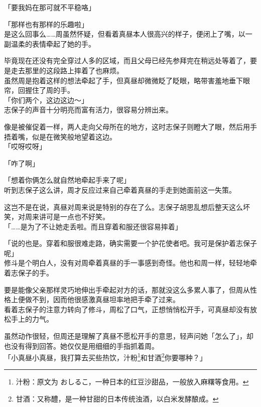 「要我妈在那可就不平稳咯」

「那样也有那样的乐趣啦」\\

是这么回事么……周虽然怀疑，但看着真昼本人很高兴的样子，便闭上了嘴，以一副温柔的表情牵起了她的手。

毕竟现在还没有完全穿过人多的区域，而且父母已经先参拜完在稍远处等着了，要是走去那里的这段路上摔着了也麻烦。\\

虽然周是抱着这样的想法牵起了手，但真昼却微微眨了眨眼，略带害羞地垂下眼帘，回握住了周的手。\\

「你们两个，这边这边～」\\

志保子的声音十分明亮而富有活力，很容易分辨出来。

像是被催促着一样，两人走向父母所在的地方，这时志保子则瞪大了眼，然后用手捂着嘴，似是在微笑般地望着这边。\\

「哎呀哎呀」

「咋了啊」

「想着你俩怎么就自然地牵起手来了呢」\\

听到志保子这么讲，周才反应过来自己牵着真昼的手走到她面前这一失策。

这岂不是在说，真昼对周来说是特别的存在了么。志保子胡思乱想后整天这么坏笑，对周来讲可是一点也不好笑。\\

「……是为了不让她走丢啦。而且穿着和服还很容易摔着」

「说的也是。穿着和服很难走路，确实需要一个护花使者吧。我可是保护着志保子呢」\\

修斗是个明白人，没有对周牵着真昼的手一事感到奇怪。他也和周一样，轻轻地牵着志保子的手。

要是能像父亲那样灵巧地伸出手牵起对方的话，那就没这么多累人事了，但周从性格上便做不到，因而他很感激真昼坦率地把手牵了过来。\\

看着志保子的注意力转向了修斗，周松了口气，正想悄悄松开手，可真昼却没有放松手上的力气。

虽然动作很轻，但周还是理解了真昼不愿松开手的意思，轻声问她「怎么了」，却也没有得到回答。她仅仅是用细细的手指抓着周。\\

「小真昼小真昼，我打算去买些热饮，汁粉\footnote{汁粉：原文为 {\jpfont おしるこ}，一种日本的红豆沙甜品，一般放入麻糬等食用。}和甘酒\footnote{甘酒：又称醴，是一种甘甜的日本传统浊酒，以白米发酵酿成。}你要哪种？」

